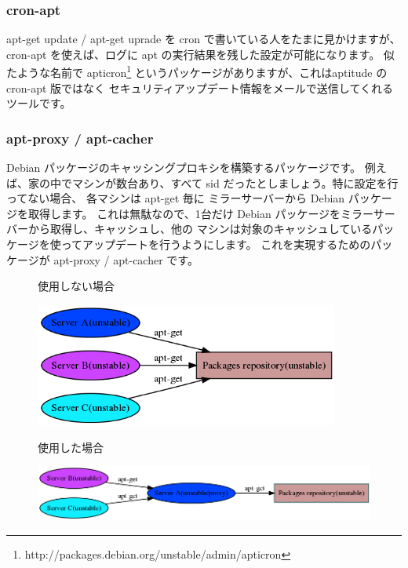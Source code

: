 \documentclass[mingoth,a4paper]{jsarticle}
\begin{document}
\subsubsection{cron-apt}
 apt-get update / apt-get uprade を cron で書いている人をたまに見かけますが、
 cron-apt を使えば、ログに apt の実行結果を残した設定が可能になります。
 似たような名前で apticron\footnote{http://packages.debian.org/unstable/admin/apticron}
 というパッケージがありますが、これはaptitude の cron-apt 版ではなく 
 セキュリティアップデート情報をメールで送信してくれるツールです。

\subsubsection{apt-proxy / apt-cacher}
 Debian パッケージのキャッシングプロキシを構築するパッケージです。
 例えば、家の中でマシンが数台あり、すべて sid だったとしましょう。特に設定を行ってない場合、
 各マシンは apt-get 毎に ミラーサーバーから Debian パッケージを取得します。
 これは無駄なので、1台だけ Debian パッケージをミラーサーバーから取得し、キャッシュし、他の
 マシンは対象のキャッシュしているパッケージを使ってアップデートを行うようにします。
 これを実現するためのパッケージが apt-proxy / apt-cacher です。
 \begin{figure}[h]
 \begin{center}
使用しない場合

 \includegraphics[width=10cm]{image200709/apt-proxy.png}
 \end{center}
 \end{figure}

 \begin{figure}[h]
 \begin{center}
使用した場合

 \includegraphics[width=15cm]{image200709/apt-proxy-e.png}
 \end{center}
 \end{figure}
\end{document}
